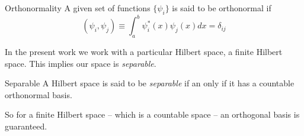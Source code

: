 \begin{definition}{Orthonormality}{}
A given set of functions $\{\psi_{i}\}$ is said to be orthonormal if
\begin{equation}
    \left(\psi_{i}, \psi_{j}\right) \equiv \int_{a}^{b} \psi_{i}^{*}(x)\psi_{j}(x) dx = \delta_{ij} 
\end{equation}
\end{definition}
In the present work we work with a particular Hilbert space, a finite Hilbert space. This implies our space is \textit{separable}.
\begin{definition}{Separable}{}
    A Hilbert space is said to be \textit{separable} if an only if it has a countable orthonormal basis.
\end{definition}
So for a finite Hilbert space -- which is a countable space -- an orthogonal basis is guaranteed.
